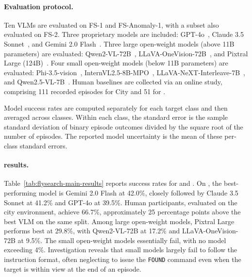 \paragraph{Evaluation protocol.} Ten VLMs are evaluated on FS-1 and FS-Anomaly-1, with a subset also evaluated on FS-2. Three proprietary models are included: GPT-4o~\cite{achiam2023gpt}, Claude 3.5 Sonnet~\cite{Anthropic_2024}, and Gemini 2.0 Flash~\cite{Google_2024}. Three large open-weight models (above 11B parameters) are evaluated: Qwen2-VL-72B~\cite{Qwen2VL}, LLaVA-OneVision-72B~\cite{li2024llavaonevisioneasyvisualtask}, and Pixtral Large (124B)~\cite{Mistral_2025}. Four small open-weight models (below 11B parameters) are evaluated: Phi-3.5-vision~\cite{abdin2024phi3technicalreporthighly}, InternVL2.5-8B-MPO~\cite{wang2024enhancingreasoningabilitymultimodal}, LLaVA-NeXT-Interleave-7B~\cite{li2024llavanextinterleavetacklingmultiimagevideo}, and Qwen2.5-VL-7B~\cite{bai2025qwen2}. Human baselines are collected via an online study, comprising 111 recorded episodes for \challenge{} City and 51 for \hardchallenge{}.

Model success rates are computed separately for each target class and then averaged across classes. Within each class, the standard error is the sample standard deviation of binary episode outcomes divided by the square root of the number of episodes. The reported model uncertainty is the mean of these per-class standard errors.

\paragraph{\challenge{} results.} Table~\ref{tab:flysearch-main-results} reports success rates for \challenge{} and \hardchallenge{}. On \challenge{}, the best-performing model is Gemini 2.0 Flash at 42.0\%, closely followed by Claude 3.5 Sonnet at 41.2\% and GPT-4o at 39.5\%. Human participants, evaluated on the city environment, achieve 66.7\%, approximately 25 percentage points above the best VLM on the same split. Among large open-weight models, Pixtral Large performs best at 29.8\%, with Qwen2-VL-72B at 17.2\% and LLaVA-OneVision-72B at 9.5\%. The small open-weight models essentially fail, with no model exceeding 4\%. Investigation reveals that small models largely fail to follow the instruction format, often neglecting to issue the \texttt{FOUND} command even when the target is within view at the end of an episode.


